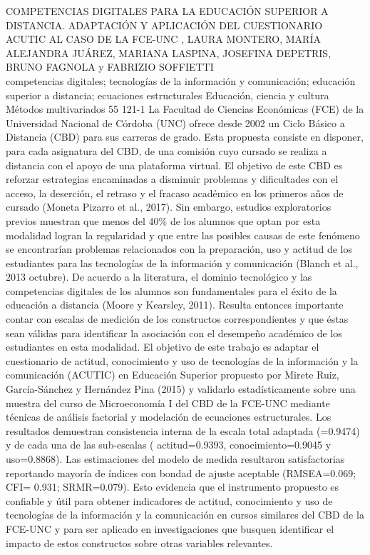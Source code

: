 \A
{COMPETENCIAS DIGITALES PARA LA EDUCACIÓN SUPERIOR A DISTANCIA. ADAPTACIÓN Y APLICACIÓN DEL CUESTIONARIO ACUTIC AL CASO DE LA FCE-UNC}
{, LAURA MONTERO, MARÍA ALEJANDRA JUÁREZ, MARIANA LASPINA, JOSEFINA DEPETRIS, BRUNO FAGNOLA y FABRIZIO SOFFIETTI}
{
\\}
{competencias digitales; tecnologías de la información y comunicación; educación superior a distancia; ecuaciones estructurales} 
 {Educación, ciencia y cultura} 
 {Métodos multivariados} 
 {55} 
 {121-1}
{La Facultad de Ciencias Económicas (FCE) de la Universidad Nacional de Córdoba (UNC) ofrece desde 2002 un Ciclo Básico a Distancia (CBD) para sus carreras de grado. Esta propuesta consiste en disponer, para cada asignatura del CBD, de una comisión cuyo cursado se realiza a distancia con el apoyo de una plataforma virtual. El objetivo de este CBD es reforzar estrategias encaminadas a disminuir problemas y dificultades con el acceso, la deserción, el retraso y el fracaso académico en los primeros años de cursado (Moneta Pizarro et al., 2017). Sin embargo, estudios exploratorios previos muestran que menos del 40\% de los alumnos que optan por esta modalidad logran la regularidad y que entre las posibles causas de este fenómeno se encontrarían problemas relacionados con la preparación, uso y actitud de los estudiantes para las tecnologías de la información y comunicación (Blanch et al., 2013 octubre). De acuerdo a la literatura, el dominio tecnológico y las competencias digitales de los alumnos son fundamentales para el éxito de la educación a distancia (Moore y Kearsley, 2011). Resulta entonces importante contar con escalas de medición de los constructos correspondientes y que éstas sean válidas para identificar la asociación con el desempeño académico de los estudiantes en esta modalidad. El objetivo de este trabajo es adaptar el cuestionario de actitud, conocimiento y uso de tecnologías de la información y la comunicación (ACUTIC) en Educación Superior propuesto por Mirete Ruiz, García-Sánchez y Hernández Pina (2015) y validarlo estadísticamente sobre una muestra del curso de Microeconomía I del CBD de la FCE-UNC mediante técnicas de análisis factorial y modelación de ecuaciones estructurales. Los resultados demuestran consistencia interna de la escala total adaptada (=0.9474) y de cada una de las sub-escalas ( actitud=0.9393, conocimiento=0.9045 y uso=0.8868). Las estimaciones del modelo de medida resultaron satisfactorias reportando mayoría de índices con bondad de ajuste aceptable (RMSEA=0.069; CFI= 0.931; SRMR=0.079). Esto evidencia que el instrumento propuesto es confiable y útil para obtener indicadores de actitud, conocimiento y uso de tecnologías de la información y la comunicación en cursos similares del CBD de la FCE-UNC y para ser aplicado en investigaciones que busquen identificar el impacto de estos constructos sobre otras variables relevantes.}
